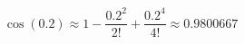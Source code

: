 \documentclass[pdflatex,compress]{beamer}
\begin{document}
	\begin{frame}
		\[ \cos(0.2) \approx 1 - \frac{0.2^2}{2!} + \frac{0.2^4}{4!} \approx 0.9800667
		 \]
	\end{frame}
\end{document}
